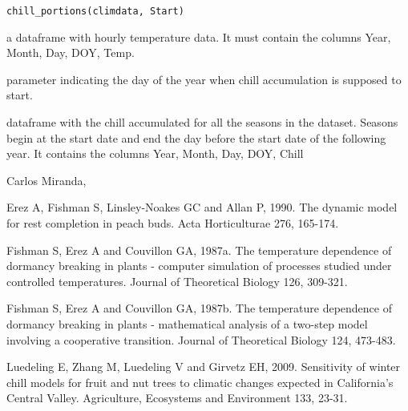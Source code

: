 \documentclass[a4paper]{book}
\begin{document}
%
\begin{Usage}
\begin{verbatim}
chill_portions(climdata, Start)
\end{verbatim}
\end{Usage}
%
\begin{Arguments}
\begin{ldescription}
\item[\code{climdata}] a dataframe with hourly temperature data. It
must contain the columns Year, Month, Day, DOY, Temp.

\item[\code{Start}] parameter indicating the day of the year when chill
accumulation is supposed to start.
\end{ldescription}
\end{Arguments}
%
\begin{Value}
dataframe with the chill accumulated for all the seasons in the
dataset. Seasons begin at the start date and end the day before the start
date of the following year.
It contains the columns Year, Month, Day, DOY, Chill
\end{Value}
%
\begin{Author}\relax
Carlos Miranda, 
\end{Author}
%
\begin{References}\relax
Erez A, Fishman S, Linsley-Noakes GC and Allan P, 1990. The dynamic model for
rest completion in peach buds. Acta Horticulturae 276, 165-174.

Fishman S, Erez A and Couvillon GA, 1987a. The temperature dependence of
dormancy breaking in plants - computer simulation of processes studied under
controlled temperatures. Journal of Theoretical Biology 126, 309-321.

Fishman S, Erez A and Couvillon GA, 1987b. The temperature dependence of
dormancy breaking in plants - mathematical analysis of a two-step model
involving a cooperative transition. Journal of Theoretical Biology 124,
473-483.

Luedeling E, Zhang M, Luedeling V and Girvetz EH, 2009. Sensitivity of
winter chill models for fruit and nut trees to climatic changes expected in
California's Central Valley. Agriculture, Ecosystems and Environment 133,
23-31.
\end{References}
%
\begin{Examples}
\end{Examples}
\end{document}
